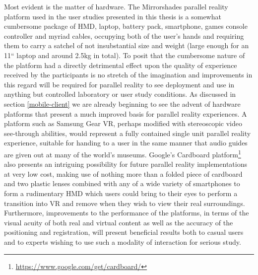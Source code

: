 Most evident is the matter of hardware. The Mirrorshades parallel reality platform used in the user studies presented in this thesis is a somewhat cumbersome package of HMD, laptop, battery pack, smartphone, games console controller and myriad cables, occupying both of the user's hands and requiring them to carry a satchel of not insubstantial size and weight (large enough for an 11`` laptop and around 2.5kg in total). To posit that the cumbersome nature of the platform had a directly detrimental effect upon the quality of experience received by the participants is no stretch of the imagination and improvements in this regard will be required for parallel reality to see deployment and use in anything but controlled laboratory or user study conditions. As discussed in section \ref{mobile-client} we are already beginning to see the advent of hardware platforms that present a much improved basis for parallel reality experiences. A platform such as Samsung Gear VR, perhaps modified with stereoscopic video see-through abilities, would represent a fully contained single unit parallel reality experience, suitable for handing to a user in the same manner that audio guides are given out at many of the world's museums. Google's Cardboard platform\footnote{\url{https://www.google.com/get/cardboard/}} also presents an intriguing possibility for future parallel reality implementations at very low cost, making use of nothing more than a folded piece of cardboard and two plastic lenses combined with any of a wide variety of smartphones to form a rudimentary HMD which users could bring to their eyes to perform a transition into VR and remove when they wish to view their real surroundings. Furthermore, improvements to the performance of the platforms, in terms of the visual acuity of both real and virtual content as well as the accuracy of the positioning and registration, will present beneficial results both to casual users and to experts wishing to use such a modality of interaction for serious study. 

